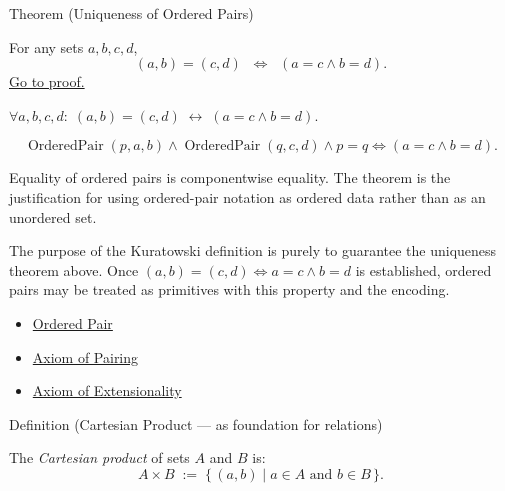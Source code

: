 \begin{theorembox}{Theorem (Uniqueness of Ordered Pairs)}
\begin{theorem}\label{thm:ordered-pair-unique}
For any sets $a,b,c,d$,
\[
(a,b) = (c,d)
\;\;\Longleftrightarrow\;\;
(a = c \land b = d).
\]
\hyperref[prf:ordered-pair-unique]{Go to proof.}
\end{theorem}
\end{theorembox}

\begin{remark*}
$\forall a, b, c, d:\; (a,b) = (c,d) \;\leftrightarrow\; (a = c \wedge b = d)$.
\end{remark*}

\begin{remark*}
\[
  \operatorname{OrderedPair}(p,a,b)
  \wedge
  \operatorname{OrderedPair}(q,c,d)
  \wedge p=q
  \iff
  (a=c\wedge b=d).
\]
\end{remark*}

\begin{remark*}[Interpretation]
Equality of ordered pairs is componentwise equality. The theorem is the
justification for using ordered-pair notation as ordered data rather than as
an unordered set.
\end{remark*}

\begin{remark*}[Exposition]
The purpose of the Kuratowski definition is purely to guarantee the uniqueness
theorem above. Once $(a,b) = (c,d) \iff a=c \land b=d$ is established,
ordered pairs may be treated as primitives with this property and the
encoding.
\end{remark*}

\begin{dependencies}
\begin{itemize}
  \item \hyperref[def:ordered-pair]{Ordered Pair}
  \item \hyperref[ax:pairing]{Axiom of Pairing}
  \item \hyperref[ax:extensionality]{Axiom of Extensionality}
\end{itemize}
\end{dependencies}

\begin{definitionbox}{Definition (Cartesian Product --- as foundation for relations)}
\begin{definition}\label{def:cartesian-product-rel}
The \emph{Cartesian product} of sets $A$ and $B$ is:
\[
A \times B
\;:=\;
\{\, (a,b) \mid a \in A \text{ and } b \in B \,\}.
\]
\end{definition}
\end{definitionbox}

